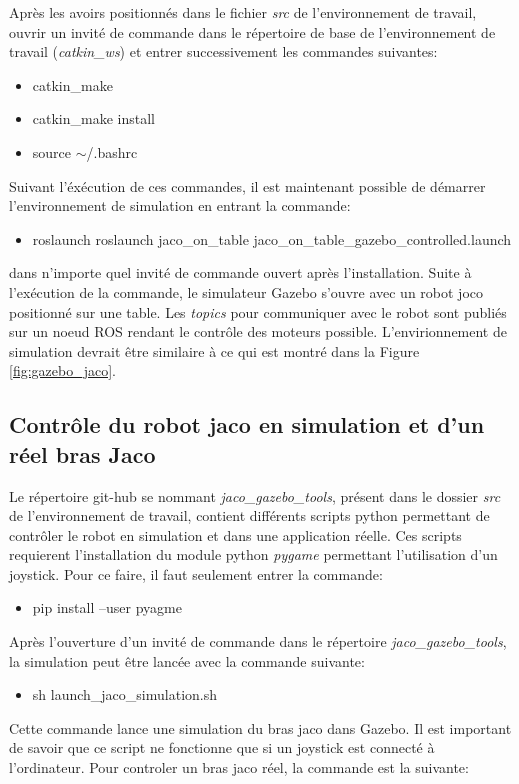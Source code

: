 \documentclass[root.tex]{subfiles}
\begin{document}
Après les avoirs positionnés dans le fichier \textit{src} de l'environnement de travail, ouvrir un invité de commande dans le répertoire de base de l'environnement de travail (\textit{catkin\_ws}) et entrer successivement les commandes suivantes:

\begin{itemize}
\item catkin\_make
\item catkin\_make install
\item source $\sim$/.bashrc
\end{itemize}

Suivant l'éxécution de ces commandes, il est maintenant possible de démarrer l'environnement de simulation en entrant la commande:
\begin{itemize}
\item roslaunch roslaunch jaco\_on\_table jaco\_on\_table\_gazebo\_controlled.launch
\end{itemize}
dans n'importe quel invité de commande ouvert après l'installation. 
Suite à l'exécution de la commande, le simulateur Gazebo s'ouvre avec un robot joco positionné sur une table.
Les \textit{topics} pour communiquer avec le robot sont publiés sur un noeud ROS rendant le contrôle des moteurs possible.
L'envirionnement de simulation devrait être similaire à ce qui est montré dans la Figure \ref{fig:gazebo_jaco}.

\subsection{Contrôle du robot jaco en simulation et d'un réel bras Jaco}

Le répertoire git-hub se nommant \textit{jaco\_gazebo\_tools}, présent dans le dossier \textit{src} de l'environnement de travail, contient différents scripts python permettant de contrôler le robot en simulation et dans une application réelle.
Ces scripts requierent l'installation du module python \textit{pygame} permettant l'utilisation d'un joystick.
Pour ce faire, il faut seulement entrer la commande:
\begin{itemize}
\item pip install --user pyagme
\end{itemize}
Après l'ouverture d'un invité de commande dans le répertoire \textit{jaco\_gazebo\_tools}, la simulation peut être lancée avec la commande suivante:
\begin{itemize}
\item sh launch\_jaco\_simulation.sh
\end{itemize}
Cette commande lance une simulation du bras jaco dans Gazebo.
Il est important de savoir que ce script ne fonctionne que si un joystick est connecté à l'ordinateur.
Pour controler un bras jaco réel, la commande est la suivante:
\end{document}
